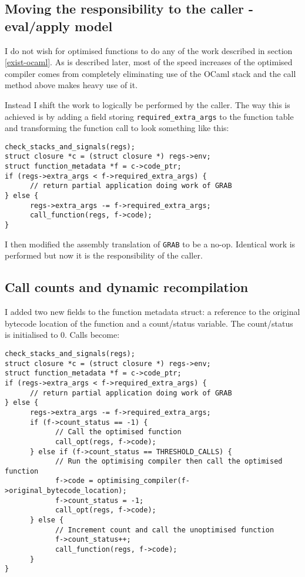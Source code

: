 \subsection{Moving the responsibility to the caller - eval/apply model}

I do not wish for optimised functions to do any of the work described in section \ref{exist-ocaml}.
As is described later, most of the speed increases of the optimised compiler comes from completely
eliminating use of the OCaml stack and the call method above makes heavy use of it.

Instead I shift the work to logically be performed by the caller. The way this is achieved is by
adding a
field storing \texttt{required\_extra\_args} to the function table and transforming the function
call to look something like this:

\begin{verbatim}
check_stacks_and_signals(regs);
struct closure *c = (struct closure *) regs->env;
struct function_metadata *f = c->code_ptr;
if (regs->extra_args < f->required_extra_args) {
      // return partial application doing work of GRAB
} else {
      regs->extra_args -= f->required_extra_args;
      call_function(regs, f->code);
}
\end{verbatim}

I then modified the assembly translation of \texttt{GRAB} to be a no-op. Identical work is
performed but now it is the responsibility of the caller.

\subsection{Call counts and dynamic recompilation} \label{final-call-logic}

I added two new fields to the function metadata struct: a reference to the original bytecode
location
of the function and a count/status variable.  The count/status is initialised to 0. Calls become:

\begin{verbatim}
check_stacks_and_signals(regs);
struct closure *c = (struct closure *) regs->env;
struct function_metadata *f = c->code_ptr;
if (regs->extra_args < f->required_extra_args) {
      // return partial application doing work of GRAB
} else { 
      regs->extra_args -= f->required_extra_args;
      if (f->count_status == -1) {
            // Call the optimised function
            call_opt(regs, f->code);
      } else if (f->count_status == THRESHOLD_CALLS) {
            // Run the optimising compiler then call the optimised function
            f->code = optimising_compiler(f->original_bytecode_location);
            f->count_status = -1;
            call_opt(regs, f->code);
      } else {
            // Increment count and call the unoptimised function 
            f->count_status++;
            call_function(regs, f->code);
      }
}
\end{verbatim}

